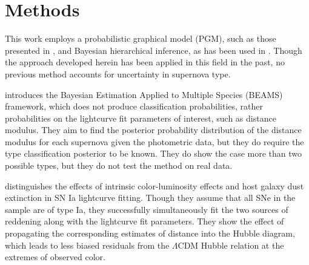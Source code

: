 \documentclass[12pt, onecolumn]{emulateapj}
\begin{document}
\section{Methods}
\label{sec:meth}

This work employs a probabilistic graphical model (PGM), such as those presented in \citet{March11, Rubin15, Ma16}, and Bayesian hierarchical inference, as has been used in \citet{Kunz07, Mandel16}.  Though the approach developed herein has been applied in this field in the past, no previous method accounts for uncertainty in supernova type.

\citet{Kunz07} introduces the Bayesian Estimation Applied to Multiple Species (BEAMS) framework, which does not produce classification probabilities, rather probabilities on the lightcurve fit parameters of interest, such as distance modulus.  They aim to find the posterior probability distribution of the distance modulus for each supernova given the photometric data, but they do require the type classification posterior to be known.  They do show the case more than two possible types, but they do not test the method on real data.

\citet{Mandel16} distinguishes the effects of intrinsic color-luminosity effects and host galaxy dust extinction in SN Ia lightcurve fitting.  Though they assume that all SNe in the sample are of type Ia, they successfully simultaneously fit the two sources of reddening along with the lightcurve fit parameters.  They show the effect of propagating the corresponding estimates of distance into the Hubble diagram, which leads to less biased residuals from the $\Lambda$CDM Hubble relation at the extremes of observed color.
\end{document}
